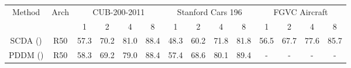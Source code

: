 \documentclass[letterpaper]{article} %
\begin{document}
\begin{table}\centering
	
	\begin{tabular}{c|c||cccc|cccc|cccc}
		\hline
		\hline
       \multirow{2.5}{*}{Method} & \multirow{2.5}{*}{Arch}& \multicolumn{4}{|c|}{CUB-200-2011}&  \multicolumn{4}{c|}{Stanford Cars 196} & \multicolumn{4}{c}{FGVC Aircraft}\\
		\cline{3-14}
		&  & 1&2&4&8& 1&2&4&8& 1&2&4&8 \\
		\hline
		\hline
		SCDA (\citeauthor{DBLP:journals/tip/WeiLWZ17})& R50& 57.3 & 70.2 & 81.0 &88.4& 48.3& 60.2&71.8&81.8& 56.5& 67.7&77.6&85.7\\
PDDM (\citeauthor{DBLP:journals/tog/Bala15})& R50& 58.3&69.2&79.0&88.4&57.4&68.6&80.1&89.4&-&-&-&-\\


\end{tabular}
\end{table}
\end{document}
